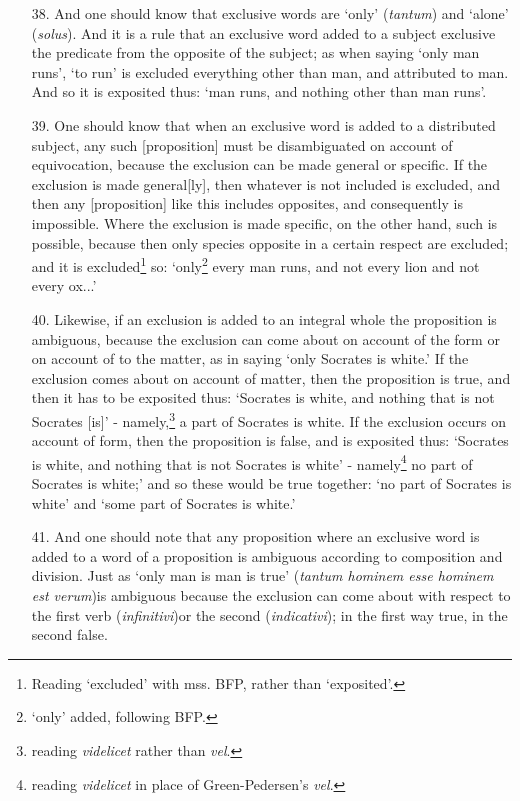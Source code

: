 \documentclass[]{article}
\begin{document}
\begin{itemize}
\item[38.] And one should know that exclusive words are `only' (\textit{tantum}) and `alone' (\textit{solus}). And it is a rule that an exclusive word added to a subject exclusive the predicate from the opposite of the subject; as when saying `only man runs', `to run' is excluded everything other than man, and attributed to man. And so it is exposited thus: `man runs, and nothing other than man runs'.
\item[39.] One should know that when an exclusive word is added to a distributed subject, any such [proposition] must be disambiguated on account of equivocation, because the exclusion can be made general or specific. If the exclusion is made general[ly], then whatever is not included is excluded, and then any [proposition] like this includes opposites, and consequently is impossible. Where the exclusion is made specific, on the other hand, such is possible, because then only species opposite in a certain respect are excluded; and it is excluded\footnote{Reading `excluded' with mss. BFP, rather than `exposited'.} so: `only\footnote{`only' added, following BFP.} every man runs, and not every lion and not every ox...'
\item[40.] Likewise, if an exclusion is added to an integral whole the proposition is ambiguous, because the exclusion can come about on account of the form or on account of to the matter, as in saying `only Socrates is white.' If the exclusion comes about on account of matter, then the proposition is true, and then it has to be exposited thus: `Socrates is white, and nothing that is not Socrates [is]' - namely,\footnote{reading \textit{videlicet} rather than \textit{vel}.} a part of Socrates is white. If the exclusion occurs on account of form, then the proposition is false, and is exposited thus: `Socrates is white, and nothing that is not Socrates is white' - namely\footnote{reading \textit{videlicet} in place of Green-Pedersen's \textit{vel}.} no part of Socrates is white;' and so these would be true together: `no part of Socrates is white' and `some part of Socrates is white.' 
\item[41.] And one should note that any proposition where an exclusive word is added to a word of a proposition is ambiguous according to composition and division. Just as `only man is man is true' (\textit{tantum hominem esse hominem est verum})is ambiguous because the exclusion can come about with respect to the first verb (\textit{infinitivi})or the second (\textit{indicativi}); in the first way true, in the second false.

\end{itemize}
\end{document}
